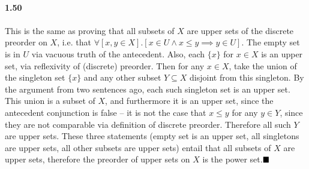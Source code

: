 \documentclass{article}
\begin{document}
 \\
\textbf{1.50}\\
 \\
This is the same as proving that all subsets of $X$ are upper sets of the discrete preorder on $X$, i.e. that $\forall \left[x,y\in X\right].\left[ x\in U \wedge x\leq y \implies y\in U \right]$. The empty set is in $U$ via vacuous truth of the antecedent. Also, each $\{ x\}$ for $x\in X$ is an upper set, via reflexivity of (discrete) preorder. Then for any $x\in X$, take the union of the singleton set $\{ x \}$ and any other subset $Y\subseteq X$ disjoint from this singleton. By the argument from two sentences ago, each such singleton set is an upper set. This union is a subset of $X$, and furthermore it is an upper set, since the antecedent conjunction is false – it is not the case that $x\leq y$ for any $y\in Y$, since they are not comparable via definition of discrete preorder. Therefore all such $Y$ are upper sets. These three statements (empty set is an upper set, all singletons are upper sets, all other subsets are upper sets) entail that all subsets of $X$ are upper sets, therefore the preorder of upper sets on $X$ is the power set.$\hfill\blacksquare$
\end{document}
